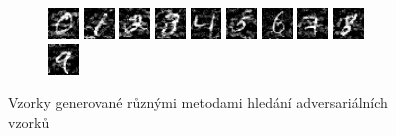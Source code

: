 \documentclass[czech]{beamer}
\begin{document}
\begin{frame}
\begin{figure}
\begin{subfigure}[b]{\textwidth}
        \end{subfigure}
        \begin{subfigure}[b]{\textwidth}
            \includegraphics[width=0.09\textwidth]{Images/Graphics/AEXAMPLES/ALLGEN/cw_1.png}
            \includegraphics[width=0.09\textwidth]{Images/Graphics/AEXAMPLES/ALLGEN/cw_3.png}
            \includegraphics[width=0.09\textwidth]{Images/Graphics/AEXAMPLES/ALLGEN/cw_5.png}
            \includegraphics[width=0.09\textwidth]{Images/Graphics/AEXAMPLES/ALLGEN/cw_7.png}
            \includegraphics[width=0.09\textwidth]{Images/Graphics/AEXAMPLES/ALLGEN/cw_2.png}
            \includegraphics[width=0.09\textwidth]{Images/Graphics/AEXAMPLES/ALLGEN/cw_34.png}
            \includegraphics[width=0.09\textwidth]{Images/Graphics/AEXAMPLES/ALLGEN/cw_18.png}
            \includegraphics[width=0.09\textwidth]{Images/Graphics/AEXAMPLES/ALLGEN/cw_37.png}
            \includegraphics[width=0.09\textwidth]{Images/Graphics/AEXAMPLES/ALLGEN/cw_17.png}
            \includegraphics[width=0.09\textwidth]{Images/Graphics/AEXAMPLES/ALLGEN/cw_4.png}
        \end{subfigure}
        \centering
        \caption{Vzorky generované různými metodami hledání adversariálních vzorků}
        \label{allgen}
    \end{figure}
\end{frame}
\end{document}

